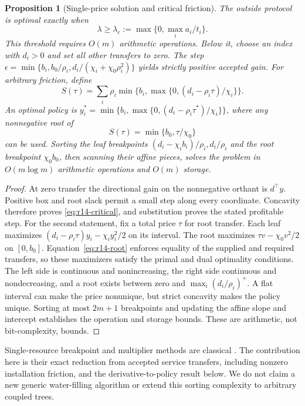 \documentclass[11pt,letterpaper]{article}
\newtheorem{proposition}[theorem]{Proposition}
\theoremstyle{definition}
\newcommand{\1}{\mathbf 1}
\begin{document}
\begin{proposition}[Single-price solution and critical friction]\label{prop:r14-price}
The outside protocol is optimal exactly when
\begin{equation}\label{eq:r14-critical}
 \lambda\geq\lambda_c:=\max\{0,\max_i a_i/t_i\}.
\end{equation}
This threshold requires $O(m)$ arithmetic operations. Below it, choose an index with $d_i>0$ and set all other transfers to zero. The step
$\epsilon=\min\{b_i,b_0/\rho_i,d_i/(\chi_i+\chi_0\rho_i^2)\}$ yields strictly positive accepted gain.
For arbitrary friction, define
\[
 S(\tau)=\sum_i\rho_i\min\{b_i,\max\{0,(d_i-\rho_i\tau)/\chi_i\}\}.
\]
An optimal policy is $y_i^*=\min\{b_i,\max\{0,(d_i-\rho_i\tau^*)/\chi_i\}\}$, where any nonnegative root of
\begin{equation}\label{eq:r14-root}
 S(\tau)=\min\{b_0,\tau/\chi_0\}
\end{equation}
can be used. Sorting the leaf breakpoints $(d_i-\chi_ib_i)/\rho_i,d_i/\rho_i$ and the root breakpoint $\chi_0b_0$, then scanning their affine pieces, solves the problem in $O(m\log m)$ arithmetic operations and $O(m)$ storage.
\end{proposition}
\begin{proof}
At zero transfer the directional gain on the nonnegative orthant is $d^\top y$. Positive box and root slack permit a small step along every coordinate. Concavity therefore proves \eqref{eq:r14-critical}, and substitution proves the stated profitable step. For the second statement, fix a total price $\tau$ for root transfer. Each leaf maximizes $(d_i-\rho_i\tau)y_i-\chi_iy_i^2/2$ on its interval. The root maximizes $\tau v-\chi_0v^2/2$ on $[0,b_0]$. Equation~\eqref{eq:r14-root} enforces equality of the supplied and required transfers, so these maximizers satisfy the primal and dual optimality conditions. The left side is continuous and nonincreasing, the right side continuous and nondecreasing, and a root exists between zero and $\max_i(d_i/\rho_i)^+$. A flat interval can make the price nonunique, but strict concavity makes the policy unique. Sorting at most $2m+1$ breakpoints and updating the affine slope and intercept establishes the operation and storage bounds. These are arithmetic, not bit-complexity, bounds.
\end{proof}

Single-resource breakpoint and multiplier methods are classical \citep{PatrikssonStromberg2015}. The contribution here is their exact reduction from accepted service transfers, including nonzero installation friction, and the derivative-to-policy result below. We do not claim a new generic water-filling algorithm or extend this sorting complexity to arbitrary coupled trees.
\end{document}

